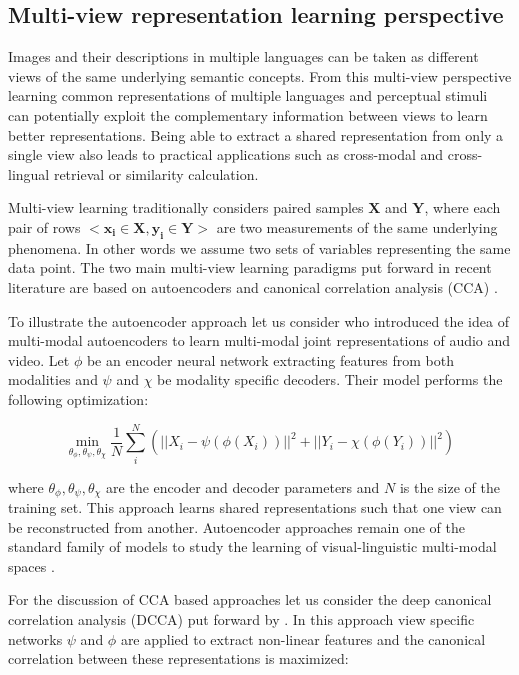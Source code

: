 \subsection{Multi-view representation learning perspective}
\label{sec:multiview}


Images and their descriptions in multiple languages can be taken as different views of the
same underlying semantic concepts. From this multi-view perspective learning common representations
of multiple languages and perceptual stimuli can potentially exploit the complementary information
between views to learn better representations. Being able to extract
a shared representation from only a single view also leads to practical applications such as
cross-modal and cross-lingual retrieval or similarity calculation.

Multi-view learning traditionally considers paired samples $\mathbf{X}$ and $\mathbf{Y}$,
where each pair of rows $<\mathbf{x_i} \in \mathbf{X}, \mathbf{y_i} \in \mathbf{Y}>$
are two measurements of the same
underlying phenomena. In other words we assume two sets of variables representing the
same data point. The two main multi-view learning paradigms put forward in recent literature are based on
autoencoders and canonical correlation analysis (CCA) \citep{wang2015deep}.

To illustrate the autoencoder approach let us consider \cite{ngiam2011multimodal} who introduced the idea
of multi-modal autoencoders to learn multi-modal joint representations of audio and video. Let
$\phi$ be an encoder neural network extracting features from both modalities and $\psi$ and $\chi$ be
modality specific decoders. Their model performs the following optimization:

\begin{equation}
\min_ {\theta_{\phi}, \theta_{\psi}, \theta_{\chi}} \frac{1}{N} \sum^N_i (||X_i - \psi(\phi(X_i))||^2 +||Y_i - \chi(\phi(Y_i))||^2)
\end{equation}

where $\theta_{\phi}, \theta_{\psi}, \theta_{\chi}$ are the encoder and decoder parameters and $N$
is the size of the training set.
This approach learns shared representations such that one view can be reconstructed from another.
Autoencoder approaches  remain one of the standard family of models
to study the learning of visual-linguistic multi-modal spaces \citep{silberer2014learning,silberer2017visually,wang2018associative}.

For the discussion of CCA based approaches let us consider the deep canonical correlation analysis (DCCA)
put forward by \cite{andrew2013deep}.  In this approach view
specific networks $\psi$ and $\phi$ are applied to extract non-linear features
and the canonical correlation between these representations is maximized:


